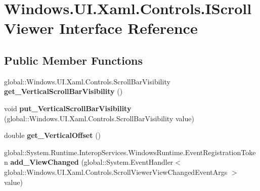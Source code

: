 \hypertarget{interface_windows_1_1_u_i_1_1_xaml_1_1_controls_1_1_i_scroll_viewer}{}\section{Windows.\+U\+I.\+Xaml.\+Controls.\+I\+Scroll\+Viewer Interface Reference}
\label{interface_windows_1_1_u_i_1_1_xaml_1_1_controls_1_1_i_scroll_viewer}
\subsection*{Public Member Functions}
\begin{DoxyCompactItemize}
\item 
\mbox{\label{interface_windows_1_1_u_i_1_1_xaml_1_1_controls_1_1_i_scroll_viewer_aac8cb7fc3dab5e040635188c0f681107}} 
global\+::\+Windows.\+U\+I.\+Xaml.\+Controls.\+Scroll\+Bar\+Visibility {\bfseries get\+\_\+\+Vertical\+Scroll\+Bar\+Visibility} ()
\item 
\mbox{\label{interface_windows_1_1_u_i_1_1_xaml_1_1_controls_1_1_i_scroll_viewer_a881abbaa0ee412df9ed83e36357e1086}} 
void {\bfseries put\+\_\+\+Vertical\+Scroll\+Bar\+Visibility} (global\+::\+Windows.\+U\+I.\+Xaml.\+Controls.\+Scroll\+Bar\+Visibility value)
\item 
\mbox{\label{interface_windows_1_1_u_i_1_1_xaml_1_1_controls_1_1_i_scroll_viewer_a40e7998d40517b4dcca9be65562ea770}} 
double {\bfseries get\+\_\+\+Vertical\+Offset} ()
\item 
\mbox{\label{interface_windows_1_1_u_i_1_1_xaml_1_1_controls_1_1_i_scroll_viewer_a8195e80e232dd0a3a3e52e8060f878bc}} 
global\+::\+System.\+Runtime.\+Interop\+Services.\+Windows\+Runtime.\+Event\+Registration\+Token {\bfseries add\+\_\+\+View\+Changed} (global\+::\+System.\+Event\+Handler$<$ global\+::\+Windows.\+U\+I.\+Xaml.\+Controls.\+Scroll\+Viewer\+View\+Changed\+Event\+Args $>$ value)
\item 
\mbox{\label{interface_windows_1_1_u_i_1_1_xaml_1_1_controls_1_1_i_scroll_viewer_a3176001cb06e45e61bbee6a898c4c7b3}} 

\end{DoxyCompactItemize}
